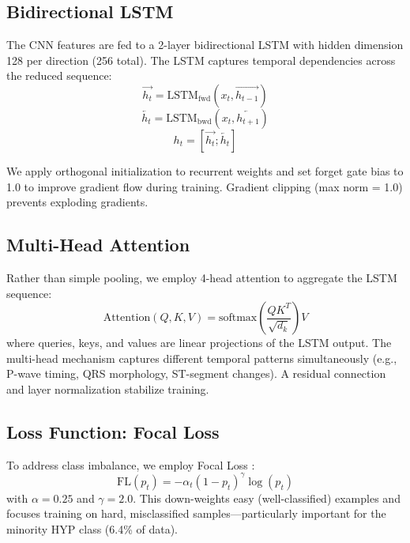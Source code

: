 \documentclass[conference]{IEEEtran}
\begin{document}
\subsection{Bidirectional LSTM}

The CNN features are fed to a 2-layer bidirectional LSTM with hidden dimension 128 per direction (256 total). The LSTM captures temporal dependencies across the reduced sequence:
\begin{equation}
    \overrightarrow{h_t} = \text{LSTM}_\text{fwd}(x_t, \overrightarrow{h_{t-1}})
\end{equation}
\begin{equation}
    \overleftarrow{h_t} = \text{LSTM}_\text{bwd}(x_t, \overleftarrow{h_{t+1}})
\end{equation}
\begin{equation}
    h_t = [\overrightarrow{h_t}; \overleftarrow{h_t}]
\end{equation}

We apply orthogonal initialization to recurrent weights and set forget gate bias to 1.0 to improve gradient flow during training. Gradient clipping (max norm = 1.0) prevents exploding gradients.

\subsection{Multi-Head Attention}

Rather than simple pooling, we employ 4-head attention to aggregate the LSTM sequence:
\begin{equation}
    \text{Attention}(Q, K, V) = \text{softmax}\left(\frac{QK^T}{\sqrt{d_k}}\right)V
\end{equation}
where queries, keys, and values are linear projections of the LSTM output. The multi-head mechanism captures different temporal patterns simultaneously (e.g., P-wave timing, QRS morphology, ST-segment changes). A residual connection and layer normalization stabilize training.

\subsection{Loss Function: Focal Loss}

To address class imbalance, we employ Focal Loss \cite{lin2017focal}:
\begin{equation}
    \text{FL}(p_t) = -\alpha_t (1 - p_t)^\gamma \log(p_t)
\end{equation}
with $\alpha = 0.25$ and $\gamma = 2.0$. This down-weights easy (well-classified) examples and focuses training on hard, misclassified samples---particularly important for the minority HYP class (6.4\% of data).
\end{document}
